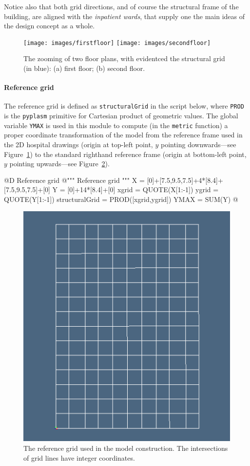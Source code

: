 \documentclass[11pt,oneside]{article}    %
\begin{document}
Notice also that both grid directions, and of course the structural frame of the building, are aligned with the \emph{inpatient wards}, that supply one the main ideas of the design concept as a whole.


\begin{figure}[htbp] %
   \centering
   \texttt{[image: images/firstfloor]} 
   \texttt{[image: images/secondfloor]} 
   \caption{The zooming of two floor plans, with evidentced the structural grid (in blue): (a) first floor; (b) second floor.}
   \label{fig:referencegrid1}
\end{figure}

\paragraph{Reference grid}

The reference grid is defined as \texttt{structuralGrid} in the script below, where \texttt{PROD} is the \texttt{pyplasm} primitive for Cartesian product of geometric values. The global variable \texttt{YMAX} is used in this module to compute (in the \texttt{metric} function) a proper coordinate transformation of the model from the reference frame used in the 2D hospital drawings (origin at top-left point, $y$ pointing downwards---see Figure~\ref{fig:referencegrid1}) to the standard righthand reference frame (origin at bottom-left point, $y$ pointing upwards---see Figure~\ref{fig:referencegrid2}).

@D Reference grid
@{""" Reference grid """
X = [0]+[7.5,9.5,7.5]+4*[8.4]+[7.5,9.5,7.5]+[0]
Y = [0]+14*[8.4]+[0]
xgrid = QUOTE(X[1:-1])
ygrid = QUOTE(Y[1:-1])
structuralGrid = PROD([xgrid,ygrid])
YMAX = SUM(Y)
@}


\begin{figure}[htbp] %
   \centering
   \includegraphics[width=0.33\linewidth]{images/hospitalgrid} 
   \caption{The reference grid used in the model construction. The intersections of grid lines have integer coordinates.}
   \label{fig:referencegrid2}
\end{figure}
\end{document}
